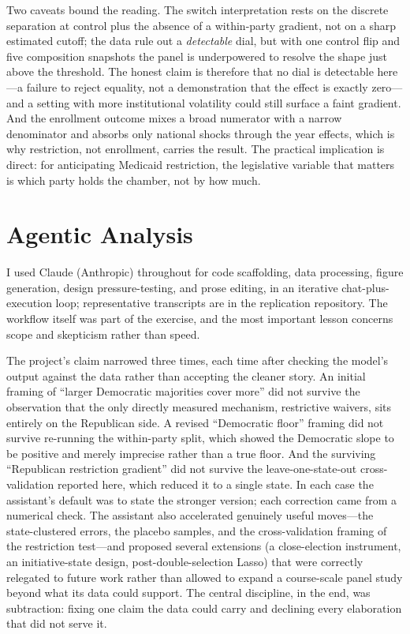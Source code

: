 \documentclass[9pt,twoside]{pnas-new}
\begin{document}
Two caveats bound the reading. The switch interpretation rests on the discrete separation at control plus the absence of a within-party gradient, not on a sharp estimated cutoff; the data rule out a \emph{detectable} dial, but with one control flip and five composition snapshots the panel is underpowered to resolve the shape just above the threshold. The honest claim is therefore that no dial is detectable here---a failure to reject equality, not a demonstration that the effect is exactly zero---and a setting with more institutional volatility could still surface a faint gradient. And the enrollment outcome mixes a broad numerator with a narrow denominator and absorbs only national shocks through the year effects, which is why restriction, not enrollment, carries the result. The practical implication is direct: for anticipating Medicaid restriction, the legislative variable that matters is which party holds the chamber, not by how much.

\section*{Agentic Analysis}

I used Claude (Anthropic) throughout for code scaffolding, data processing, figure generation, design pressure-testing, and prose editing, in an iterative chat-plus-execution loop; representative transcripts are in the replication repository. The workflow itself was part of the exercise, and the most important lesson concerns scope and skepticism rather than speed.

The project's claim narrowed three times, each time after checking the model's output against the data rather than accepting the cleaner story. An initial framing of ``larger Democratic majorities cover more'' did not survive the observation that the only directly measured mechanism, restrictive waivers, sits entirely on the Republican side. A revised ``Democratic floor'' framing did not survive re-running the within-party split, which showed the Democratic slope to be positive and merely imprecise rather than a true floor. And the surviving ``Republican restriction gradient'' did not survive the leave-one-state-out cross-validation reported here, which reduced it to a single state. In each case the assistant's default was to state the stronger version; each correction came from a numerical check. The assistant also accelerated genuinely useful moves---the state-clustered errors, the placebo samples, and the cross-validation framing of the restriction test---and proposed several extensions (a close-election instrument, an initiative-state design, post-double-selection Lasso) that were correctly relegated to future work rather than allowed to expand a course-scale panel study beyond what its data could support. The central discipline, in the end, was subtraction: fixing one claim the data could carry and declining every elaboration that did not serve it.
\end{document}
